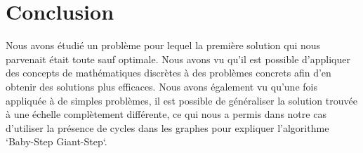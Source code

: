 \section{Conclusion}

Nous avons étudié un problème pour lequel la première solution qui nous parvenait était toute sauf optimale. Nous avons vu qu'il est possible d'appliquer des concepts de mathématiques discrètes à des problèmes concrets afin d'en obtenir des solutions plus efficaces.
Nous avons également vu qu'une fois appliquée à de simples problèmes, il est possible de généraliser la solution trouvée à une échelle complètement différente, ce qui nous a permis dans notre cas d'utiliser la présence de cycles dans les graphes pour expliquer l'algorithme `Baby-Step Giant-Step`.
